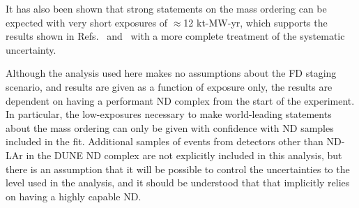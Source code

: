 It has also been shown that strong statements on the mass ordering can be expected with very short exposures of $\approx$12 kt-MW-yr, which supports the results shown in Refs.~\cite{Abi:2020qib} and~\cite{Abi:2020evt} with a more complete treatment of the systematic uncertainty.

Although the analysis used here makes no assumptions about the FD staging scenario, and results are given as a function of exposure only, the results are dependent on having a performant ND complex from the start of the experiment. In particular, the low-exposures necessary to make world-leading statements about the mass ordering can only be given with confidence with ND samples included in the fit. Additional samples of events from detectors other than ND-LAr in the DUNE ND complex are not explicitly included in this analysis, but there is an assumption that it will be possible to control the uncertainties to the level used in the analysis, and it should be understood that that implicitly relies on having a highly capable ND.
